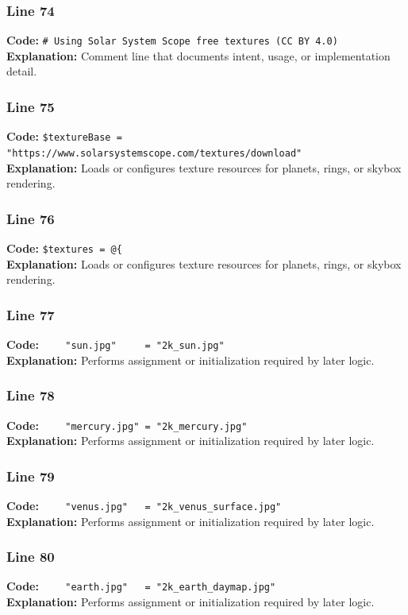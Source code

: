 \documentclass[11pt,a4paper]{article}
\begin{document}
\subsubsection*{Line 74}
\textbf{Code:} \verb|# Using Solar System Scope free textures (CC BY 4.0)|\\
\textbf{Explanation:} Comment line that documents intent, usage, or implementation detail.

\subsubsection*{Line 75}
\textbf{Code:} \verb|$textureBase = "https://www.solarsystemscope.com/textures/download"|\\
\textbf{Explanation:} Loads or configures texture resources for planets, rings, or skybox rendering.

\subsubsection*{Line 76}
\textbf{Code:} \verb|$textures = @{|\\
\textbf{Explanation:} Loads or configures texture resources for planets, rings, or skybox rendering.

\subsubsection*{Line 77}
\textbf{Code:} \verb|    "sun.jpg"     = "2k_sun.jpg"|\\
\textbf{Explanation:} Performs assignment or initialization required by later logic.

\subsubsection*{Line 78}
\textbf{Code:} \verb|    "mercury.jpg" = "2k_mercury.jpg"|\\
\textbf{Explanation:} Performs assignment or initialization required by later logic.

\subsubsection*{Line 79}
\textbf{Code:} \verb|    "venus.jpg"   = "2k_venus_surface.jpg"|\\
\textbf{Explanation:} Performs assignment or initialization required by later logic.

\subsubsection*{Line 80}
\textbf{Code:} \verb|    "earth.jpg"   = "2k_earth_daymap.jpg"|\\
\textbf{Explanation:} Performs assignment or initialization required by later logic.
\end{document}
